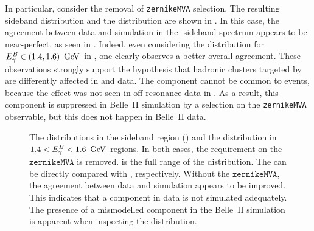 In particular, consider the removal of \texttt{zernikeMVA} selection.
The resulting \EB sideband distribution and the \Mbc distribution are shown in .
In this case, the agreement between data and simulation in the \EB-sideband spectrum appears to be near-perfect, as seen in .
Indeed, even considering the \Mbc distribution for ${E^B_{\gamma}}\in(1.4,1.6)~\mathrm{\,Ge\kern -0.1em V}$ in , one clearly observes a better overall-agreement.
These observations strongly support the hypothesis that hadronic clusters targeted by \ZMVA are differently affected in \MC and data.
The component cannot be common to \epem\ra\qqbar events, because the effect was not seen in off-resonance data in .
As a result, this component is suppressed in Belle~II simulation by a selection on the \texttt{zernikeMVA} observable, but this does not happen in Belle~II data.
\begin{figure}[htbp!]
    \caption{\label{fig:nozmva_test}   The \EB distributions in the \EB sideband region ()
    and the \Mbc distribution in $1.4<{E^B_{\gamma}}<1.6~\mathrm{\,Ge\kern -0.1em V}$ regions.
    In both cases, the requirement on the $\mathtt{zernikeMVA}$ is removed.
     is the full range of the \ZMVA distribution.
    The  can be directly compared with , respectively.
    Without the $\mathtt{zernikeMVA}$, the agreement between data and simulation appears to be improved.
    This indicates that a component in data is not simulated adequately.
    The presence of a mismodelled component in the Belle~II simulation is apparent when inspecting the \ZMVA distribution.
    }
\end{figure}

